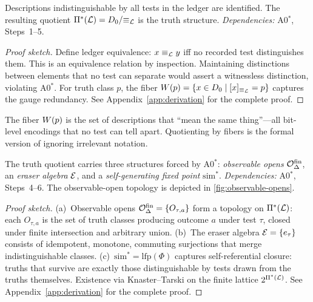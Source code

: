 \begin{theorem}
\label{thm:truth-quotient}
Descriptions indistinguishable by all tests in the ledger are identified.  The resulting quotient $\Pi^*(\mathcal{L}) = D_0 / {\equiv_{\mathcal{L}}}$ is the truth structure.
\emph{Dependencies:} A0$^*$, Steps~1--5.
\begin{proof}[Proof sketch]
Define ledger equivalence: $x \equiv_{\mathcal{L}} y$ iff no recorded test distinguishes them.  This is an equivalence relation by inspection.  Maintaining distinctions between elements that no test can separate would assert a witnessless distinction, violating A0$^*$.  For truth class $p$, the fiber $W(p) = \{x \in D_0 \mid [x]_{\equiv_{\mathcal{L}}} = p\}$ captures the gauge redundancy.
See Appendix~\ref{app:derivation} for the complete proof.
\end{proof}
\end{theorem}

\begin{remark}
\label{rem:fiber-intuition}
The fiber $W(p)$ is the set of descriptions that ``mean the same thing''---all
bit-level encodings that no test can tell apart.  Quotienting by fibers is
the formal version of ignoring irrelevant notation.
\end{remark}

\begin{theorem}
\label{thm:indistinguishability}
The truth quotient carries three structures forced by A0$^*$: \emph{observable opens} $\mathcal{O}^{\mathrm{fin}}_\Delta$, an \emph{eraser algebra} $\mathcal{E}$, and a \emph{self-generating fixed point} $\mathrm{sim}^*$.
\emph{Dependencies:} A0$^*$, Steps~4--6.
The observable-open topology is depicted in \cref{fig:observable-opens}.
\begin{proof}[Proof sketch]
(a)~Observable opens $\mathcal{O}^{\mathrm{fin}}_\Delta = \{O_{\tau,a}\}$ form a topology on $\Pi^*(\mathcal{L})$: each $O_{\tau,a}$ is the set of truth classes producing outcome $a$ under test $\tau$, closed under finite intersection and arbitrary union.  (b)~The eraser algebra $\mathcal{E} = \{e_\tau\}$ consists of idempotent, monotone, commuting surjections that merge indistinguishable classes.  (c)~$\mathrm{sim}^* = \mathrm{lfp}(\Phi)$ captures self-referential closure: truths that survive are exactly those distinguishable by tests drawn from the truths themselves.  Existence via Knaster--Tarski on the finite lattice $2^{\Pi^*(\mathcal{L})}$.
See Appendix~\ref{app:derivation} for the complete proof.
\end{proof}
\end{theorem}

